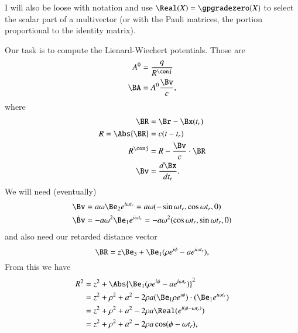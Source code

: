 {I will also be loose with notation and use \(\Real(X) = \gpgradezero{X}\) to select the scalar part of a multivector (or with the Pauli matrices, the portion proportional to the identity matrix).

Our task is to compute the Lienard-Wiechert potentials.  Those are
%
\begin{equation}\label{eqn:relativisticElectrodynamicsExamReflection:50}
\begin{aligned}
A^0 &= \frac{q}{R^\conj} \\
\BA &= A^0 \frac{\Bv}{c},
\end{aligned}
\end{equation}
%
where
%
\begin{equation}\label{eqn:relativisticElectrodynamicsExamReflection:70}
\begin{aligned}
\BR &= \Br - \Bx(t_r) \\
R = \Abs{\BR} &= c (t - t_r) \\
R^\conj &= R - \frac{\Bv}{c} \cdot \BR \\
\Bv &= \frac{d\Bx}{dt_r}.
\end{aligned}
\end{equation}
%
We will need (eventually)
%
\begin{equation}\label{eqn:relativisticElectrodynamicsExamReflection:90}
\begin{aligned}
\Bv &= a \omega \Be_2 e^{i \omega t_r} = a \omega ( -\sin \omega t_r, \cos\omega t_r, 0) \\
\dot{\Bv} &= -a \omega^2 \Be_1 e^{i \omega t_r} =
-a \omega^2 (\cos\omega t_r, \sin\omega t_r, 0)
\end{aligned}
\end{equation}
%
and also need our retarded distance vector
%
\begin{equation}\label{eqn:relativisticElectrodynamicsExamReflection:110}
\BR = z \Be_3 + \Be_1 (\rho e^{i \phi} - a e^{i \omega t_r} ),
\end{equation}
%
From this we have
%
\begin{equation}\label{eqn:relativisticElectrodynamicsExamReflection:1050}
\begin{aligned}
R^2
&= z^2 + \Abs{\Be_1 (\rho e^{i \phi} - a e^{i \omega t_r} )}^2 \\
&= z^2 + \rho^2 + a^2 - 2 \rho a (\Be_1 \rho e^{i \phi}) \cdot (\Be_1 e^{i \omega t_r}) \\
&= z^2 + \rho^2 + a^2 - 2 \rho a \Real( e^{ i(\phi - \omega t_r) } ) \\
&= z^2 + \rho^2 + a^2 - 2 \rho a \cos(\phi - \omega t_r),

\end{aligned}
\end{equation}}
